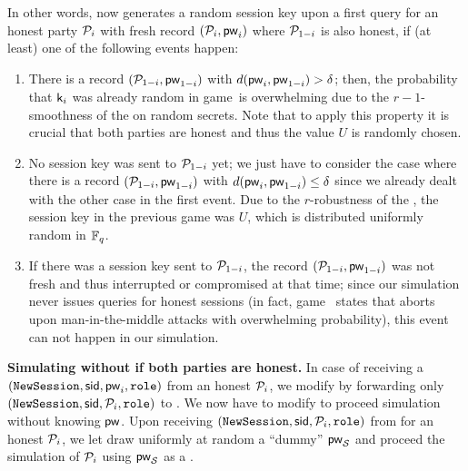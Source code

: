 \begin{games}
In other words, \Func now generates a random session key upon a first \NewKey query for an honest party $\mathcal{P}_{i}$ with fresh record $(\mathcal{P}_{i},\mathsf{pw}_{i})$ where $\mathcal{P}_{1-i}$ is also honest, if (at least) one of the following events happen:
\begin{enumerate}
 \item There is a record $(\mathcal{P}_{1-i},\mathsf{pw}_{1-i})$ with $d(\mathsf{pw}_{i},\mathsf{pw}_{1-i}) > \delta$; then, the probability that $\mathsf{k}_{i}$ was already random in game~\previousgame is overwhelming due to the $r-1$-smoothness of the \RSS on random secrets. Note that to apply this property it is crucial that both parties are honest and thus the value $U$ is randomly chosen.
 \item No session key was sent to $\mathcal{P}_{1-i}$ yet; we just have to consider the case where there is a record $(\mathcal{P}_{1-i},\mathsf{pw}_{1-i})$ with $d(\mathsf{pw}_{i},\mathsf{pw}_{1-i}) \leq \delta$ since we already dealt with the other case in the first event. Due to the $r$-robustness of the \RSS, the session key in the previous game was $U$, which is distributed uniformly random in $\mathbb{F}_q$.
 \item If there was a session key sent to $\mathcal{P}_{1-i}$, the record $(\mathcal{P}_{1-i},\mathsf{pw}_{1-i})$ was not fresh and thus interrupted or compromised at that time; since our simulation never issues \TestPwd queries for honest sessions (in fact, game~ states that \Sim aborts upon man-in-the-middle attacks with overwhelming probability), this event can not happen in our simulation. %
\end{enumerate} 

\textbf{Simulating without \password if both parties are honest.}
In case of receiving a $(\texttt{NewSession},\mathsf{sid},\mathsf{pw}_{i},\texttt{role})$ from an honest $\mathcal{P}_{i}$, we modify \Func by forwarding only $(\texttt{NewSession},\mathsf{sid},\mathcal{P}_{i},\texttt{role})$ to \Sim. We now have to modify \Sim to proceed simulation without knowing $\mathsf{pw}$. Upon receiving $(\texttt{NewSession},\mathsf{sid},\mathcal{P}_{i},\texttt{role})$ from \Func for an honest $\mathcal{P}_{i}$, we let \Sim draw uniformly at random a ``dummy'' \password $\mathsf{pw}_\mathcal{S}$ and proceed the simulation of $\mathcal{P}_{i}$ using $\mathsf{pw}_\mathcal{S}$ as a \password.


\end{games}
